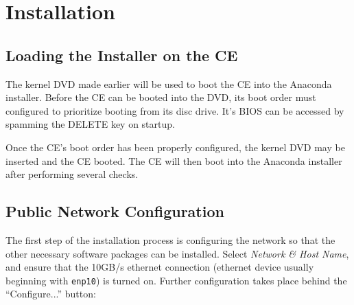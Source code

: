 \documentclass[12pt]{article}
\begin{document}


\section{Installation}

\subsection{Loading the Installer on the CE}

\qq The kernel DVD made earlier will be used to boot the CE into the Anaconda
installer. Before the CE can be booted into the DVD, its boot order must
configured to prioritize booting from its disc drive. It's BIOS can be accessed
by spamming the DELETE key on startup. 

\qq Once the CE's boot order has been properly configured, the kernel DVD may be
inserted and the CE booted. The CE will then boot into the Anaconda installer
after performing several checks.

%
%

\subsection{Public Network Configuration}

\qq The first step of the installation process is configuring the network so
that the other necessary software packages can be installed. Select
\textit{Network \& Host Name}, and ensure that the 10GB/s ethernet connection
(ethernet device usually beginning with {\tt enp10}) is turned on. Further
configuration takes place behind the ``Configure...'' button:
\end{document}
